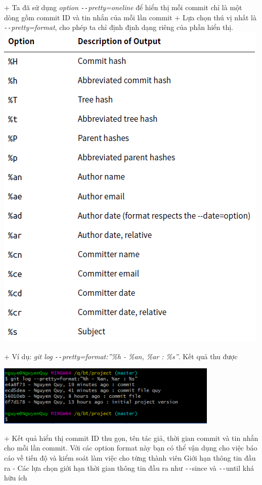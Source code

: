 \documentclass[12pt,a4paper]{report}
\begin{document}
	\label{fig:screenshot020}
\vskip 0.4cm\vskip 0.4cm
+ Ta đã sử dụng {\it option \texttt{-{}-}pretty=oneline} để hiển thị mỗi commit chỉ là một dòng gồm commit ID và tin nhắn của mỗi lần commit\vskip 0.4cm
+ Lựa chọn thú vị nhất là {\it \texttt{-{}-}pretty=format}, cho phép ta chỉ định định dạng riêng của phần hiển thị.
\vskip 0.4cm
	\includegraphics[width=0.8\linewidth]{screenshot021}

	\label{fig:screenshot021}
\vskip 0.4cm\vskip 0.4cm
+ Ví dụ: {\it git log \texttt{-{}-}pretty=format:”\%h - \%an, \%ar : \%s”}. Kết quả thu được\vskip 0.4cm

	\includegraphics[width=0.8\linewidth]{screenshot022}

	\label{fig:screenshot022}
\vskip 0.4cm\vskip 0.4cm
+ Kết quả hiển thị commit ID thu gọn, tên tác giả, thời gian commit và tin nhắn cho mỗi lần commit. Với các option format này bạn có thể vận dụng cho việc báo cáo về tiến độ và kiểm soát làm việc cho từng thành viên\vskip 0.4cm
 Giới hạn thông tin đầu ra\vskip 0.4cm
- Các lựa chọn giới hạn thời gian thông tin đầu ra như \texttt{-{}-}since và \texttt{-{}-}until khá hữu ích\vskip 0.4cm
\end{document}
